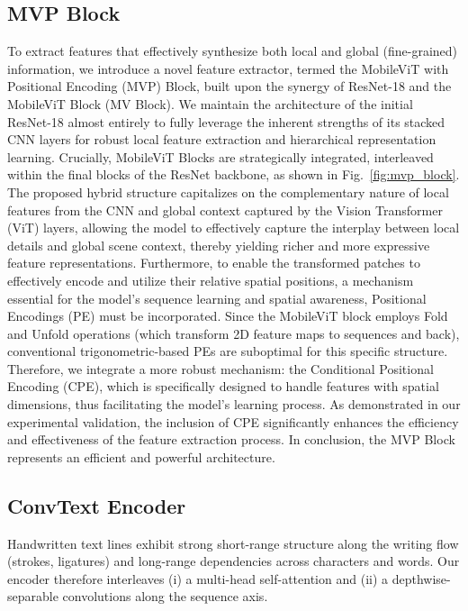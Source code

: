 \documentclass[final,5p,times]{elsarticle}
\begin{document}
\subsection{MVP Block}
To extract features that effectively synthesize both local and global (fine-grained) information, we introduce a novel feature extractor, termed the MobileViT \cite{mv} with Positional Encoding (MVP) Block, built upon the synergy of ResNet-18 and the MobileViT Block (MV Block). We maintain the architecture of the initial ResNet-18 almost entirely to fully leverage the inherent strengths of its stacked CNN layers for robust local feature extraction and hierarchical representation learning. Crucially, MobileViT Blocks are strategically integrated, interleaved within the final blocks of the ResNet backbone, as shown in Fig.~\ref{fig:mvp_block}. The proposed hybrid structure capitalizes on the complementary nature of local features from the CNN and global context captured by the Vision Transformer (ViT) layers, allowing the model to effectively capture the interplay between local details and global scene context, thereby yielding richer and more expressive feature representations. Furthermore, to enable the transformed patches to effectively encode and utilize their relative spatial positions, a mechanism essential for the model's sequence learning and spatial awareness, Positional Encodings (PE) must be incorporated. Since the MobileViT block employs Fold and Unfold operations (which transform 2D feature maps to sequences and back), conventional trigonometric-based PEs are suboptimal for this specific structure. Therefore, we integrate a more robust mechanism: the Conditional Positional Encoding \cite{cpe} (CPE), which is specifically designed to handle features with spatial dimensions, thus facilitating the model's learning process. As demonstrated in our experimental validation, the inclusion of CPE significantly enhances the efficiency and effectiveness of the feature extraction process. In conclusion, the MVP Block represents an efficient and powerful architecture.

\subsection{ConvText Encoder}
Handwritten text lines exhibit strong short-range structure along the writing flow (strokes, ligatures) and long-range dependencies across characters and words. Our encoder therefore interleaves (i) a multi-head self-attention and (ii) a depthwise-separable convolutions along the sequence axis.
\end{document}
